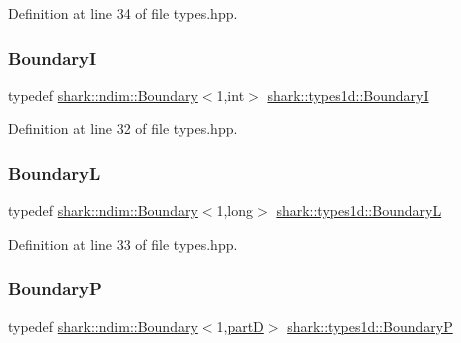 Definition at line 34 of file types.\+hpp.

\hypertarget{namespaceshark_1_1types1d_a2d68c8b34e33ecf5d76eb6b631588b7c}{}\label{namespaceshark_1_1types1d_a2d68c8b34e33ecf5d76eb6b631588b7c} 
\subsubsection{\texorpdfstring{BoundaryI}{BoundaryI}}
{\footnotesize\ttfamily typedef \hyperlink{classshark_1_1ndim_1_1_boundary}{shark\+::ndim\+::\+Boundary}$<$1,int$>$ \hyperlink{namespaceshark_1_1types1d_a2d68c8b34e33ecf5d76eb6b631588b7c}{shark\+::types1d\+::\+BoundaryI}}



Definition at line 32 of file types.\+hpp.

\hypertarget{namespaceshark_1_1types1d_a1a32b7a698d4ba32c285ab84f5ad9c0e}{}\label{namespaceshark_1_1types1d_a1a32b7a698d4ba32c285ab84f5ad9c0e} 
\subsubsection{\texorpdfstring{BoundaryL}{BoundaryL}}
{\footnotesize\ttfamily typedef \hyperlink{classshark_1_1ndim_1_1_boundary}{shark\+::ndim\+::\+Boundary}$<$1,long$>$ \hyperlink{namespaceshark_1_1types1d_a1a32b7a698d4ba32c285ab84f5ad9c0e}{shark\+::types1d\+::\+BoundaryL}}



Definition at line 33 of file types.\+hpp.

\hypertarget{namespaceshark_1_1types1d_a9a7f7cd2f7bc5df6dbf8d9f9983248bc}{}\label{namespaceshark_1_1types1d_a9a7f7cd2f7bc5df6dbf8d9f9983248bc} 
\subsubsection{\texorpdfstring{BoundaryP}{BoundaryP}}
{\footnotesize\ttfamily typedef \hyperlink{classshark_1_1ndim_1_1_boundary}{shark\+::ndim\+::\+Boundary}$<$1,\hyperlink{namespaceshark_1_1types1d_a46775e0f758bf283c37ef3733ac9e294}{partD}$>$ \hyperlink{namespaceshark_1_1types1d_a9a7f7cd2f7bc5df6dbf8d9f9983248bc}{shark\+::types1d\+::\+BoundaryP}}



